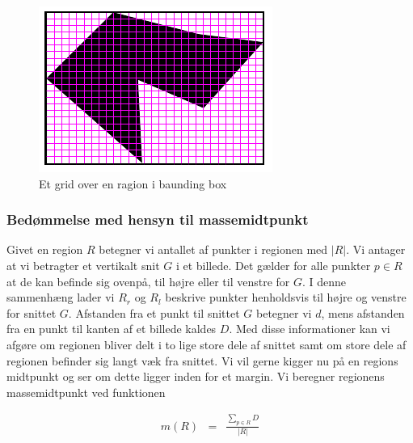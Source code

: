 {\begin{figure}[h]
	\centering
	\includegraphics[scale=0.76,angle=0]{afsnit/vores_implementation/billeder/udvidet_loesning/udvidetloesninglayer.png}
	\caption[]{Et grid over en ragion i baunding box}
	\label{grid}
\end{figure}

\subsubsection{Bedømmelse med hensyn til massemidtpunkt}
Givet en region $R$ betegner vi antallet af punkter i regionen med
$|R|$. Vi antager at vi betragter et vertikalt snit $G$ i et billede.
Det gælder for alle punkter $p \in R$ at de kan befinde sig ovenpå, til
højre eller til venstre for $G$. I denne sammenhæng lader vi $R_r$ og
$R_l$ beskrive punkter henholdsvis til højre og venstre for snittet $G$.
Afstanden fra et punkt til snittet $G$ betegner vi $d$, mens afstanden
fra en punkt til kanten af et billede kaldes $D$. Med disse
informationer kan vi afgøre om regionen bliver delt i to lige store dele
af snittet samt om store dele af regionen befinder sig langt væk fra
snittet. Vi vil gerne kigger nu på en regions midtpunkt og ser om dette
ligger inden for et margin. Vi beregner regionens massemidtpunkt ved
funktionen


\begin{eqnarray}
    m(R) & = & \frac{\sum_{p \in R}{D}}{|R|}
    \label{MPunkt}
\end{eqnarray}

}
